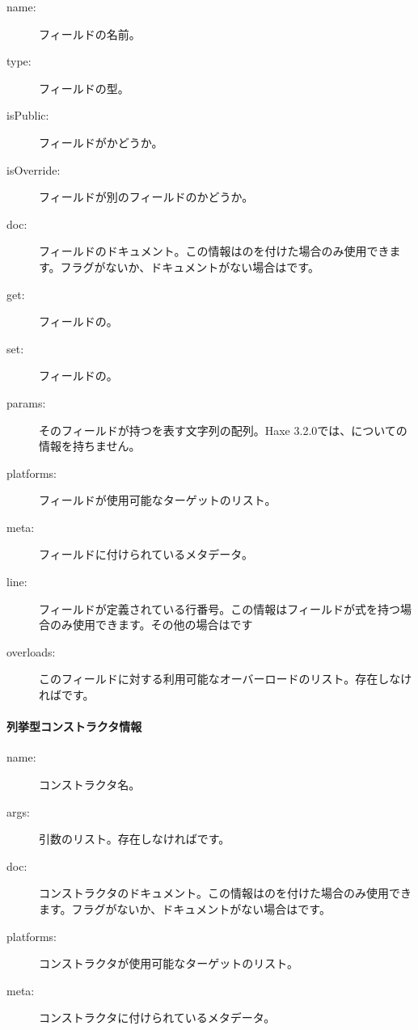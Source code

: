\begin{description}
	\item[name:] フィールドの名前。
	\item[type:] フィールドの型。
	\item[isPublic:] フィールドがかどうか。
	\item[isOverride:] フィールドが別のフィールドのかどうか。
	\item[doc:] フィールドのドキュメント。この情報はのを付けた場合のみ使用できます。フラグがないか、ドキュメントがない場合はです。
	\item[get:] フィールドの。
	\item[set:] フィールドの。
	\item[params:] そのフィールドが持つを表す文字列の配列。Haxe 3.2.0では、についての情報を持ちません。
	\item[platforms:] フィールドが使用可能なターゲットのリスト。
	\item[meta:] フィールドに付けられているメタデータ。
	\item[line:] フィールドが定義されている行番号。この情報はフィールドが式を持つ場合のみ使用できます。その他の場合はです
	\item[overloads:] このフィールドに対する利用可能なオーバーロードのリスト。存在しなければです。
\end{description}

\paragraph{列挙型コンストラクタ情報}
\label{cr-rtti-enum-constructor-information}

\begin{description}
	\item[name:] コンストラクタ名。
	\item[args:] 引数のリスト。存在しなければです。
	\item[doc:] コンストラクタのドキュメント。この情報はのを付けた場合のみ使用できます。フラグがないか、ドキュメントがない場合はです。
	\item[platforms:] コンストラクタが使用可能なターゲットのリスト。
	\item[meta:] コンストラクタに付けられているメタデータ。
\end{description}
